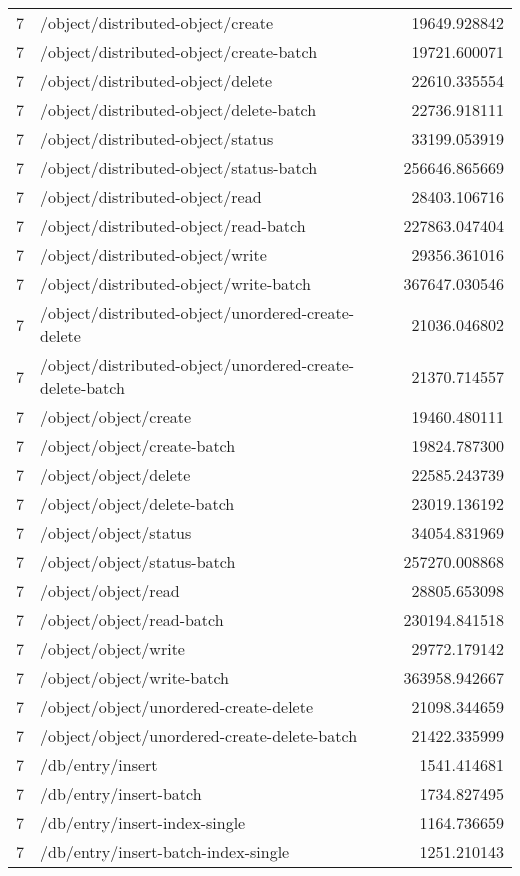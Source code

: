 \begin{longtable}{rlr}
7 & /object/distributed-object/create & 19649.928842 \\
7 & /object/distributed-object/create-batch & 19721.600071 \\
7 & /object/distributed-object/delete & 22610.335554 \\
7 & /object/distributed-object/delete-batch & 22736.918111 \\
7 & /object/distributed-object/status & 33199.053919 \\
7 & /object/distributed-object/status-batch & 256646.865669 \\
7 & /object/distributed-object/read & 28403.106716 \\
7 & /object/distributed-object/read-batch & 227863.047404 \\
7 & /object/distributed-object/write & 29356.361016 \\
7 & /object/distributed-object/write-batch & 367647.030546 \\
7 & /object/distributed-object/unordered-create-delete & 21036.046802 \\
7 & /object/distributed-object/unordered-create-delete-batch & 21370.714557 \\
7 & /object/object/create & 19460.480111 \\
7 & /object/object/create-batch & 19824.787300 \\
7 & /object/object/delete & 22585.243739 \\
7 & /object/object/delete-batch & 23019.136192 \\
7 & /object/object/status & 34054.831969 \\
7 & /object/object/status-batch & 257270.008868 \\
7 & /object/object/read & 28805.653098 \\
7 & /object/object/read-batch & 230194.841518 \\
7 & /object/object/write & 29772.179142 \\
7 & /object/object/write-batch & 363958.942667 \\
7 & /object/object/unordered-create-delete & 21098.344659 \\
7 & /object/object/unordered-create-delete-batch & 21422.335999 \\
7 & /db/entry/insert & 1541.414681 \\
7 & /db/entry/insert-batch & 1734.827495 \\
7 & /db/entry/insert-index-single & 1164.736659 \\
7 & /db/entry/insert-batch-index-single & 1251.210143 \\

\end{longtable}
